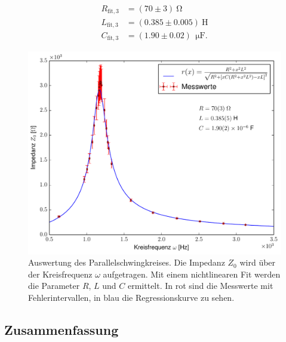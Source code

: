 \documentclass[12pt,a4paper,titlepage,headinclude]{scrartcl}
\numberwithin{equation}{subsection}
\newcommand{\mrm}[1]{\mathrm{#1}}
\begin{document}
\begin{align}
	R_{\mrm{fit},3}&=(70\pm3)~\mrm{\Omega}
	\label{eq:Rfit3}\\
	L_{\mrm{fit},3}&=(0.385\pm0.005)~\mrm{H}
	\label{eq:Lfit3}\\
	C_{\mrm{fit},3}&=(1.90\pm0.02)~\SI{}{\micro\farad}.
\end{align}
\begin{figure}[h!]
	\centering
	\includegraphics[width=\textwidth]{plot5.pdf}
	\caption{Auswertung des Parallelschwingkreises. Die Impedanz $Z_0$ wird über der Kreisfrequenz $\omega$ aufgetragen. Mit einem nichtlinearen Fit werden die Parameter $R$, $L$ und $C$ ermittelt. In rot sind die Messwerte mit Fehlerintervallen, in blau die Regressionskurve zu sehen.}
	\label{fig:plot5}
\end{figure}
\subsection{Zusammenfassung}
\end{document}
